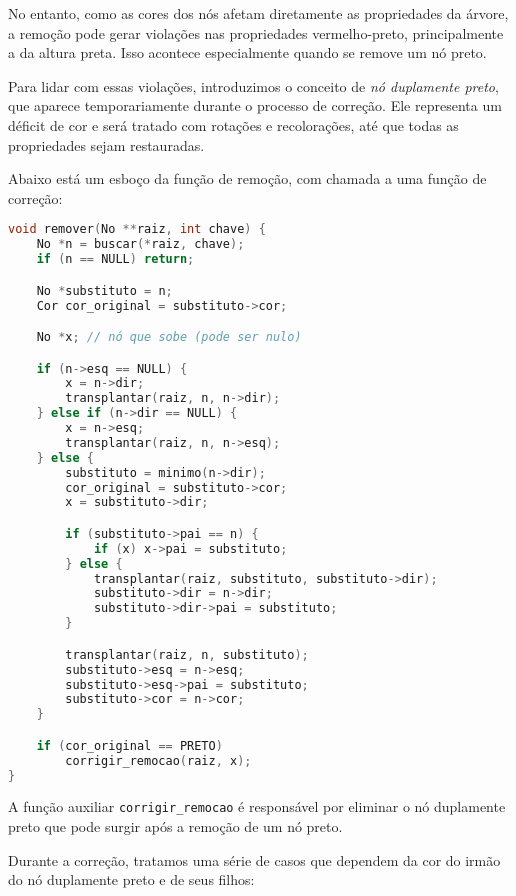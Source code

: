 No entanto, como as cores dos nós afetam diretamente as propriedades da árvore, a remoção pode gerar violações nas propriedades vermelho-preto, principalmente a da altura preta. 
Isso acontece especialmente quando se remove um nó preto.

Para lidar com essas violações, introduzimos o conceito de {\em nó duplamente preto}, que aparece temporariamente durante o processo de correção. 
Ele representa um déficit de cor e será tratado com rotações e recolorações, até que todas as propriedades sejam restauradas.

Abaixo está um esboço da função de remoção, com chamada a uma função de correção:

\begin{lstlisting}[language=C, caption={Remoção em árvore vermelho-preto}, label=lst:remocao_rb]
void remover(No **raiz, int chave) {
    No *n = buscar(*raiz, chave);
    if (n == NULL) return;

    No *substituto = n;
    Cor cor_original = substituto->cor;

    No *x; // nó que sobe (pode ser nulo)

    if (n->esq == NULL) {
        x = n->dir;
        transplantar(raiz, n, n->dir);
    } else if (n->dir == NULL) {
        x = n->esq;
        transplantar(raiz, n, n->esq);
    } else {
        substituto = minimo(n->dir);
        cor_original = substituto->cor;
        x = substituto->dir;

        if (substituto->pai == n) {
            if (x) x->pai = substituto;
        } else {
            transplantar(raiz, substituto, substituto->dir);
            substituto->dir = n->dir;
            substituto->dir->pai = substituto;
        }

        transplantar(raiz, n, substituto);
        substituto->esq = n->esq;
        substituto->esq->pai = substituto;
        substituto->cor = n->cor;
    }

    if (cor_original == PRETO)
        corrigir_remocao(raiz, x);
}
\end{lstlisting}

A função auxiliar \texttt{corrigir\_remocao} é responsável por eliminar o nó duplamente preto que pode surgir após a remoção de um nó preto.

Durante a correção, tratamos uma série de casos que dependem da cor do irmão do nó duplamente preto e de seus filhos:

